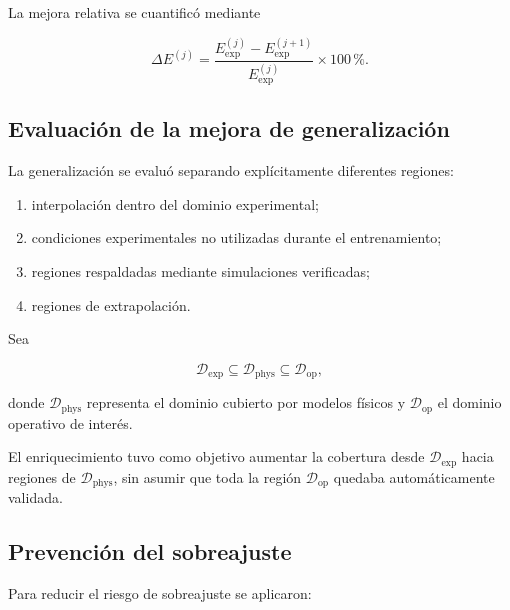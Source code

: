 La mejora relativa se cuantificó mediante

\begin{equation}
\Delta E^{(j)}
=
\frac{
E_{\mathrm{exp}}^{(j)}
-
E_{\mathrm{exp}}^{(j+1)}
}{
E_{\mathrm{exp}}^{(j)}
}
\times 100\,\%.
\label{eq:mejora_relativa_enriquecimiento}
\end{equation}

\subsection{Evaluación de la mejora de generalización}
\label{subsec:generalizacion_hibrida}

La generalización se evaluó separando explícitamente diferentes regiones:

\begin{enumerate}
    \item interpolación dentro del dominio experimental;
    \item condiciones experimentales no utilizadas durante el entrenamiento;
    \item regiones respaldadas mediante simulaciones verificadas;
    \item regiones de extrapolación.
\end{enumerate}

Sea

\begin{equation}
\mathcal{D}_{\mathrm{exp}}
\subseteq
\mathcal{D}_{\mathrm{phys}}
\subseteq
\mathcal{D}_{\mathrm{op}},
\end{equation}

donde $\mathcal{D}_{\mathrm{phys}}$ representa el dominio cubierto por modelos físicos y $\mathcal{D}_{\mathrm{op}}$ el dominio operativo de interés.

El enriquecimiento tuvo como objetivo aumentar la cobertura desde $\mathcal{D}_{\mathrm{exp}}$ hacia regiones de $\mathcal{D}_{\mathrm{phys}}$, sin asumir que toda la región $\mathcal{D}_{\mathrm{op}}$ quedaba automáticamente validada.

\subsection{Prevención del sobreajuste}
\label{subsec:overfitting_hibrido}

Para reducir el riesgo de sobreajuste se aplicaron:

